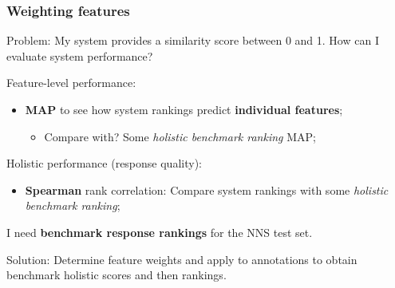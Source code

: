 \documentclass[handout,xcolor={dvipsnames}]{beamer}
\begin{document}
\begin{frame}
\frametitle{Weighting features}

Problem: My system provides a similarity score between 0 and 1. How can I evaluate system performance?

\pause
\vspace{1em}
Feature-level performance:
\begin{itemize}
\pause
\item \textbf{MAP} to see how system rankings predict \textbf{individual features};
\begin{itemize}
\pause
\item Compare with? Some \textit{holistic benchmark ranking} MAP;
\end{itemize}
\end{itemize}

\vspace{.3em}
\pause
Holistic performance (response quality):
\begin{itemize}
\pause
\item \textbf{Spearman} rank correlation: Compare system rankings with some \textit{holistic benchmark ranking};
\end{itemize}

\pause
I need \textbf{benchmark response rankings} for the NNS test set.

\pause
\vspace{1em}
Solution: Determine feature weights and apply to annotations to obtain benchmark holistic scores and then rankings.
\end{frame}
\end{document}
